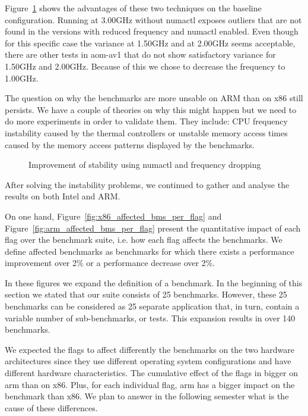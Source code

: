 Figure~\ref{fig:EncoderModeSpeed11RealtimeInputBosphorus4K} shows the advantages
of these two techniques on the baseline configuration. Running at 3.00GHz
without numactl exposes outliers that are not found in the versions with reduced
frequency and numactl enabled. Even though for this specific case the variance
at 1.50GHz and at 2.00GHz seems acceptable, there are other tests in aom-av1
that do not show satisfactory variance for 1.50GHz and 2.00GHz. Because of this
we chose to decrease the frequency to 1.00GHz.

The question on why the benchmarks are more unsable on ARM than on x86 still
persists. We have a couple of theories on why this might happen but we need to
do more experiments in order to validate them. They include: CPU frequency
instability caused by the thermal controllers or unstable memory access times
caused by the memory access patterns displayed by the benchmarks. 

\begin{figure}[H]
  \centering
  
  \caption{Improvement of stability using numactl and frequency dropping}
  \label{fig:EncoderModeSpeed11RealtimeInputBosphorus4K}
\end{figure}

After solving the instability problems, we continued to gather and analyse the
results on both Intel and ARM.

On one hand, Figure~\ref{fig:x86_affected_bms_per_flag} and
Figure~\ref{fig:arm_affected_bms_per_flag} present the quantitative impact of
each flag over the benchmark suite, i.e. how each flag affects the benchmarks.
We define affected benchmarks as benchmarks for which there exists a performance
improvement over 2\% or a performance decrease over 2\%.

In these figures we expand the definition of a benchmark. In the beginning of
this section we stated that our suite consists of 25 benchmarks. However, these
25 benchmarks can be considered as 25 separate application that, in turn,
contain a variable number of sub-benchmarks, or tests. This expansion results in
over 140 benchmarks.

We expected the flags to affect differently the benchmarks on the two hardware
architectures since they use different operating system configurations and have
different hardware characteristics. The cumulative effect of the flags in bigger
on arm than on x86. Plus, for each individual flag, arm has a bigger impact on
the benchmark than x86. We plan to answer in the following semester what is the
cause of these differences.

